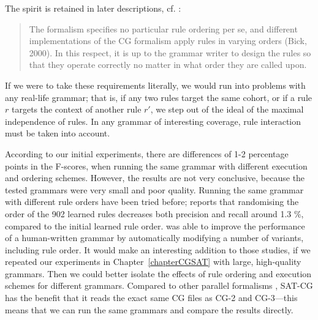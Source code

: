 \noindent The spirit is retained in later descriptions, cf. \cite{hulden2011cg_engine}:

\begin{quote} 
The formalism specifies no particular rule ordering per se, and different implementations of the CG formalism apply rules in varying orders (Bick, 2000).  In this respect, it is up to the grammar writer to design the rules so that they operate correctly no matter in what order they are called upon. 
\end{quote}

\noindent If we were to take these requirements literally, we would run into problems with any real-life grammar; that is, if any two rules target the same cohort, or if a rule $r$ targets the context of another rule $r'$, we step out of the ideal of the maximal independence of rules.
In any grammar of interesting coverage, rule interaction must be taken into account.

According to our initial experiments, there are differences of 1-2 percentage points in the F-scores, when running the same grammar with different execution and ordering schemes. However, the results are not very conclusive, because the tested grammars were very small and poor quality.
Running the same grammar with different rule orders have been tried before; \cite{lager2001transformation} reports that randomising the order of the 902 learned rules 
decreases both precision and recall around 1.3 \%, compared to the initial learned rule order. %
\cite{bick2013tuning} was able to improve the performance of a human-written grammar by automatically modifying a number of variants, including rule order.
It would make an interesting addition to those studies, if we repeated our experiments in Chapter~\ref{chapterCGSAT} with large, high-quality grammars.
Then we could better isolate the effects of rule ordering and execution schemes for different grammars.
Compared to other parallel formalisms \cite{koskenniemi90,voutilainen1994designing,oflazer97votingconstraints,lager98}, SAT-CG has the benefit that it reads the exact same CG files as CG-2 and CG-3---this means that we can run the same grammars and compare the results directly. 




